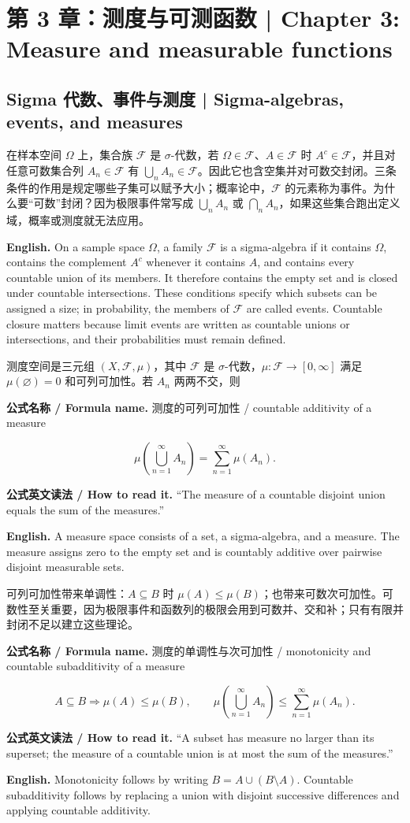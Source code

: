 \documentclass[UTF8,11pt,a4paper]{ctexart}
\newcommand{\EN}[1]{\par\noindent\textbf{English.} #1\par}
\newcommand{\READ}[1]{\par\noindent\textbf{公式英文读法 / How to read it.} #1\par}
\let\APSsubsection\subsection
\renewcommand{\subsection}[1]{\Needspace{6\baselineskip}\APSsubsection{#1}}
\newcommand{\chaptersection}[1]{\Needspace{10\baselineskip}\refstepcounter{section}\section*{#1}}
\newcommand{\FORMULA}[2]{\par\Needspace{3\baselineskip}\noindent\textbf{公式名称 / Formula name.} #1 / #2\par}
\begin{document}
\chaptersection{第 3 章：测度与可测函数 | Chapter 3: Measure and measurable functions}
\subsection{Sigma 代数、事件与测度 | Sigma-algebras, events, and measures}
\noindent 在样本空间 $\Omega$ 上，集合族 $\mathcal F$ 是 $\sigma$-代数，若 $\Omega\in\mathcal F$、$A\in\mathcal F$ 时 $A^c\in\mathcal F$，并且对任意可数集合列 $A_n\in\mathcal F$ 有 $\bigcup_nA_n\in\mathcal F$。因此它也含空集并对可数交封闭。三条条件的作用是规定哪些子集可以赋予大小；概率论中，$\mathcal F$ 的元素称为事件。为什么要“可数”封闭？因为极限事件常写成 $\bigcup_n A_n$ 或 $\bigcap_n A_n$，如果这些集合跑出定义域，概率或测度就无法应用。
\EN{On a sample space $\Omega$, a family $\mathcal F$ is a sigma-algebra if it contains $\Omega$, contains the complement $A^c$ whenever it contains $A$, and contains every countable union of its members. It therefore contains the empty set and is closed under countable intersections. These conditions specify which subsets can be assigned a size; in probability, the members of $\mathcal F$ are called events. Countable closure matters because limit events are written as countable unions or intersections, and their probabilities must remain defined.}
\noindent 测度空间是三元组 $(X,\mathcal F,\mu)$，其中 $\mathcal F$ 是 $\sigma$-代数，$\mu:\mathcal F\to[0,\infty]$ 满足 $\mu(\varnothing)=0$ 和可列可加性。若 $A_n$ 两两不交，则
\FORMULA{测度的可列可加性}{countable additivity of a measure}
\[
\mu\left(\bigcup_{n=1}^{\infty}A_n\right)
=\sum_{n=1}^{\infty}\mu(A_n).
\]
\READ{“The measure of a countable disjoint union equals the sum of the measures.”}
\EN{A measure space consists of a set, a sigma-algebra, and a measure. The measure assigns zero to the empty set and is countably additive over pairwise disjoint measurable sets.}
\noindent 可列可加性带来单调性：$A\subseteq B$ 时 $\mu(A)\le\mu(B)$；也带来可数次可加性。可数性至关重要，因为极限事件和函数列的极限会用到可数并、交和补；只有有限并封闭不足以建立这些理论。
\FORMULA{测度的单调性与次可加性}{monotonicity and countable subadditivity of a measure}
\[
A\subseteq B\Longrightarrow\mu(A)\le\mu(B),\qquad
\mu\!\left(\bigcup_{n=1}^{\infty}A_n\right)
\le\sum_{n=1}^{\infty}\mu(A_n).
\]
\READ{“A subset has measure no larger than its superset; the measure of a countable union is at most the sum of the measures.”}
\EN{Monotonicity follows by writing $B=A\cup(B\setminus A)$. Countable subadditivity follows by replacing a union with disjoint successive differences and applying countable additivity.}
\end{document}
